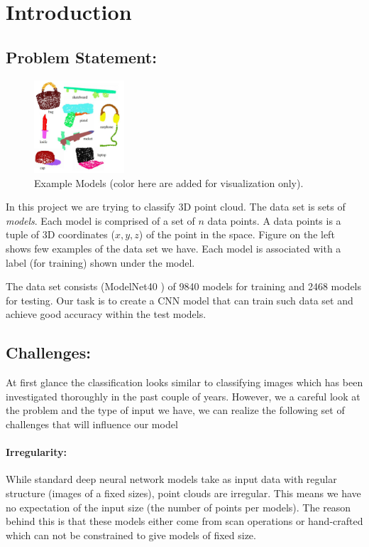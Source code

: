\section{Introduction} 
\subsection{Problem Statement:}
\begin{figure}
  \begin{center}
    \includegraphics[width=0.3\textwidth]{fig/ex.JPG}
  \end{center} 
  \caption*{Example Models (color here are added for visualization only).}
\end{figure}

In this project we are trying to classify 3D point cloud. The data set is sets of \emph{models}. Each model is comprised of a set of $n$ data points. A data points is a tuple of 3D coordinates ($x,y,z$) of the point in the space. Figure on the left shows few examples of the data set we have. Each model is associated with a label (for training) shown under the model. 

The data set consists (ModelNet40 \citep{wu20153d}) of 9840 models for training and 2468 models for testing. Our task is to create a CNN model that can train such data set and achieve good accuracy within the test models. 


\subsection{Challenges:}
At first glance the classification looks similar to classifying images which has been investigated thoroughly in the past couple of years. However, we a careful look at the problem and the type of input we have, we can realize the following set of challenges that will influence our model
\paragraph{Irregularity:}
While standard deep neural network models take as input data with regular structure (images of a fixed sizes), point clouds are irregular. This means we have no expectation of the input size (the number of points per models). The reason behind this is that these models either come from scan operations or hand-crafted which can not be constrained to give models of fixed size.


